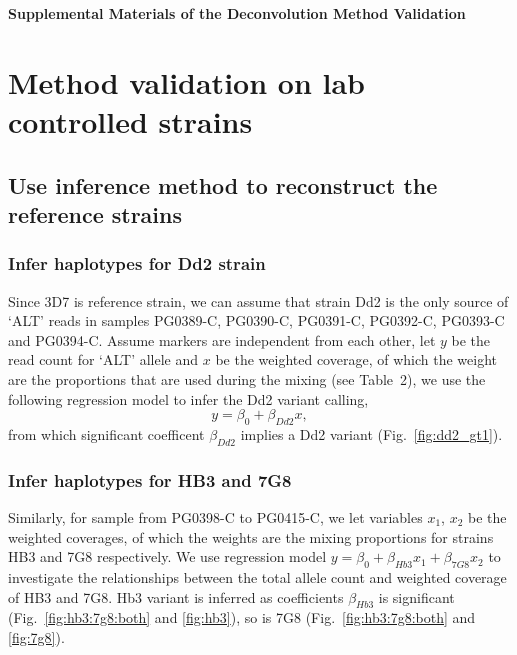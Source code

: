 

\begin{center}
\textbf{\large Supplemental Materials of the Deconvolution Method Validation}
\end{center}

\section{Method validation on lab controlled strains} \label{sup:sec:validate}



\subsection{Use inference method to reconstruct the reference strains}
\subsubsection{Infer haplotypes for Dd2 strain}
Since 3D7 is reference strain, we can assume that strain Dd2 is the only source of `ALT' reads in samples {\textmd PG0389-C}, {\textmd PG0390-C}, {\textmd PG0391-C}, {\textmd PG0392-C}, {\textmd PG0393-C} and {\textmd PG0394-C}. Assume markers are independent from each other, let $y$ be the read count for `ALT' allele and $x$ be the weighted coverage, of which the weight are the proportions that are used during the mixing (see Table~2), we use the following regression model to infer the Dd2 variant calling, $$y = \beta_0 + \beta_{Dd2} x,$$
from which significant coefficent $\beta_{Dd2}$ implies a Dd2 variant (Fig.~\ref{fig:dd2_gt1}).

\subsubsection{Infer haplotypes for HB3 and 7G8}
Similarly, for sample from {\textmd PG0398-C} to {\textmd PG0415-C},  we let variables $x_1$, $x_2$ be the weighted coverages, of which the weights are the mixing proportions for strains HB3 and 7G8 respectively. We use regression model $y = \beta_0 + \beta_{Hb3} x_1 + \beta_{7G8} x_2$ to investigate the relationships between the total allele count and weighted coverage of HB3 and 7G8. Hb3 variant is inferred as coefficients $\beta_{Hb3}$ is significant (Fig.~\ref{fig:hb3:7g8:both} and \ref{fig:hb3}), so is 7G8 (Fig.~\ref{fig:hb3:7g8:both} and \ref{fig:7g8}).




